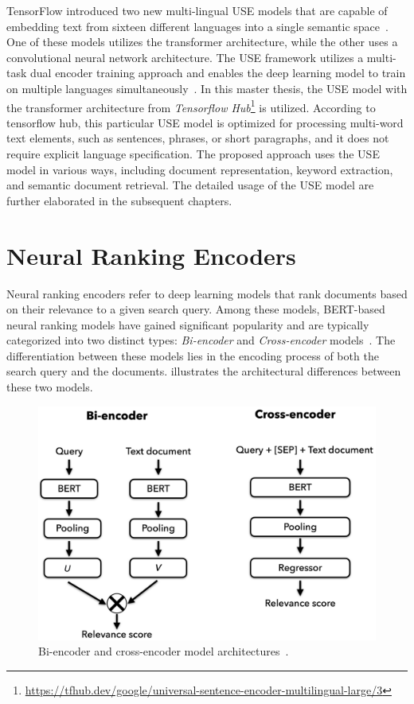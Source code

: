 \begin{description}
	TensorFlow introduced two new multi-lingual \ac{USE} models that are capable of embedding text from sixteen different languages into a single semantic space~\cite{yang2019multilingual}. One of these models utilizes the transformer architecture, while the other uses a convolutional neural network architecture. The \ac{USE} framework utilizes a multi-task dual encoder training approach and enables the deep learning model to train on multiple languages simultaneously~\cite{yang2019multilingual}. In this master thesis, the \ac{USE} model with the transformer architecture from \emph{Tensorflow Hub}\footnote{\url{https://tfhub.dev/google/universal-sentence-encoder-multilingual-large/3}} is utilized. According to tensorflow hub, this particular \ac{USE} model is optimized for processing multi-word text elements, such as sentences, phrases, or short paragraphs, and it does not require explicit language specification. The proposed approach uses the \ac{USE} model in various ways, including document representation, keyword extraction, and semantic document retrieval. The detailed usage of the \ac{USE} model are further elaborated in the subsequent chapters.

	
\end{description}

\section{Neural Ranking Encoders}

Neural ranking encoders refer to deep learning models that rank documents based on their relevance to a given search query. Among these models, BERT-based neural ranking models have gained significant popularity and are typically categorized into two distinct types: \emph{Bi-encoder} and \emph{Cross-encoder} models~\cite{choi2021improving, jung2022semi, ishihara2022nikkei}. The differentiation between these models lies in the encoding process of both the search query and the documents.  illustrates the architectural differences between these two models.

\begin{figure}[h]
	\centering
	\includegraphics[width=.8\textwidth]{images/thesis_images/neural_ranking_models.png}
	\caption[Bi-encoder and cross-encoder model architectures.]{Bi-encoder and cross-encoder model architectures~\cite{ ishihara2022nikkei}. \label{fig:neural_reranker}}
\end{figure}

